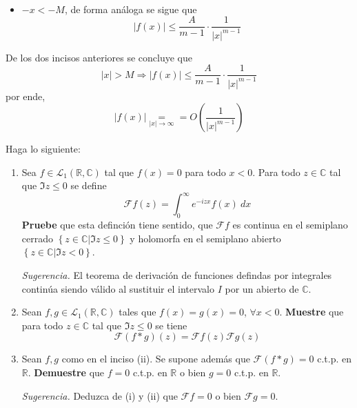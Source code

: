 \documentclass[12pt]{report}
\theoremstyle{largebreak}
\renewcommand{\leq}{\ensuremath{\leqslant}}
\newcommand\abs[1]{\ensuremath{\left|#1\right|}}
\newcommand{\fou}[1]{\ensuremath{\mathcal{F}#1}}
\begin{document}
\begin{sol}
\begin{itemize}
\begin{equation*}
\begin{split}
                \end{split}
            \end{equation*}
            \item $-x<-M$, de forma análoga se sigue que
            \begin{equation*}
                \abs{f(x)}\leq \frac{A}{m-1}\cdot\frac{1}{\abs{x}^{m-1}}
            \end{equation*}
        \end{itemize}
        De los dos incisos anteriores se concluye que
        \begin{equation*}
            \abs{x}>M\Rightarrow \abs{f(x)}\leq \frac{A}{m-1}\cdot\frac{1}{\abs{x}^{m-1}}
        \end{equation*}
        por ende,
        \begin{equation*}
            \abs{f(x)}\underset{\abs{x}\rightarrow\infty}{=}=O\left(\frac{1}{\abs{x}^{ m-1}} \right)
        \end{equation*}

    \end{sol}

    \begin{excer}
        Haga lo siguiente:
        \begin{enumerate}
            \item Sea $f\in\mathcal{L}_1(\mathbb{R},\mathbb{C})$ tal que $f(x)=0$ para todo $x<0$. Para todo $z\in\mathbb{C}$ tal que $\Im z\leq 0$ se define
            \begin{equation*}
                \fou{f}(z)=\int_0^{\infty}e^{ -izx}f(x)\:dx
            \end{equation*}
            \textbf{Pruebe} que esta definción tiene sentido, que $\fou{f}$ es continua en el semiplano cerrado $\left\{z\in\mathbb{C}\Big|\Im z\leq0 \right\}$ y holomorfa en el semiplano abierto $\left\{z\in\mathbb{C}\Big|\Im z<0 \right\}$.

            \textit{Sugerencia.} El teorema de derivación de funciones defindas por integrales continúa siendo válido al sustituir el intervalo $I$ por un abierto de $\mathbb{C}$.

            \item Sean $f,g\in\mathcal{L}_1(\mathbb{R},\mathbb{C})$ tales que $f(x)=g(x)=0$, $\forall x<0$. \textbf{Muestre} que para todo $z\in\mathbb{C}$ tal que $\Im z\leq 0$ se tiene
            \begin{equation*}
                \fou{(f*g)}(z)=\fou{f}(z)\fou{g}(z)
            \end{equation*}
            \item Sean $f,g$ como en el inciso (ii). Se supone además que $\fou{(f*g)}=0$ c.t.p. en $\mathbb{R}$. \textbf{Demuestre} que $f=0$ c.t.p. en $\mathbb{R}$ o bien $g=0$ c.t.p. en $\mathbb{R}$.
            
            \textit{Sugerencia.} Deduzca de (i) y (ii) que $\fou{f}=0$ o bien $\fou{g}=0$.
        \end{enumerate}
    \end{excer}
\end{document}
